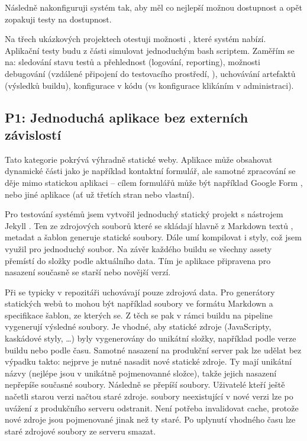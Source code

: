         Následně nakonfiguruji systém tak, aby měl co nejlepší možnou dostupnost a opět zopakuji testy na dostupnost.

        Na třech ukázkových projektech otestuji možnosti \CI, které systém nabízí. Aplikační testy budu z části simulovat jednoduchým bash scriptem.  Zaměřím se na: sledování stavu testů a přehlednost (logování, reporting), možnosti debugování (vzdálené připojení do testovacího prostředí, ), uchovávání artefaktů (výsledků buildu), konfigurace v kódu (vs konfigurace klikáním v administraci). 

        \subsection{P1: Jednoduchá aplikace bez externích závislostí}
            Tato kategorie pokrývá výhradně statické weby. Aplikace může obsahovat dynamické části jako je například kontaktní formulář, ale samotné zpracování se děje mimo statickou aplikaci -- cílem formulářů může být například Google Form \cite{mccoy-google-form}, nebo jiné aplikace (ať už třetích stran nebo vlastní).

            Pro testování \CICD systémů jsem vytvořil jednoduchý statický projekt s nástrojem Jekyll \cite{jekyll}. Ten ze zdrojových souborů které se skládají hlavně z Markdown textů \cite{markdown}, metadat a šablon generuje statické \HTML soubory. Dále umí kompilovat i styly, což jsem využil pro jednoduchý  soubor. Na závěr každého buildu se všechny assety přemístí do složky podle aktuálního data. Tím je aplikace připravena pro nasazení současně se starší nebo novější verzí.


            Při \CICD se typicky v repozitáři uchovávají pouze zdrojová data. Pro generátory statických webů to mohou být například soubory ve formátu Markdown a specifikace \HTML šablon, ze kterých se. Z těch se pak v rámci buildu na \CICD pipeline vygenerují výsledné \HTML soubory. Je vhodné, aby statické zdroje (JavaScripty, kaskádové styly, \ldots) byly vygenerovány do unikátní složky, například podle verze buildu nebo podle času. Samotné nasazení na produkční server pak lze udělat bez výpadku takto: nejprve je nutné nasadit nové statické zdroje. Ty mají unikátní názvy (nejlépe jsou v unikátně pojmenovanné složce), takže jejich nasazení nepřepíše současné soubory. Následně se přepíší \HTML soubory. Uživatelé kteří ještě načetli starou verzi načtou staré zdroje. \HTML soubory neexistující v nové verzi lze po uvážení z produkčního serveru odstranit. Není potřeba invalidovat cache, protože nové zdroje jsou pojmenované jinak než ty staré. Po uplynutí vhodného času lze staré zdrojové soubory ze serveru smazat.

